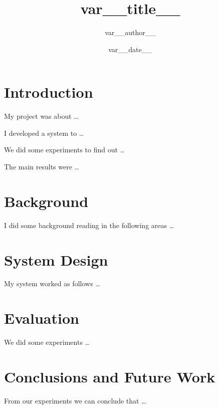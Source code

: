 \documentclass[a4paper, var__font__pt]{article}
\title{var__title__}
\author{var__author__}
\date{var__date__}
\begin{document}
\maketitle
\tableofcontents

\section{Introduction}

My project was about \ldots

I developed a system to \ldots

We did some experiments to find out \ldots

The main results were \ldots

\pagebreak

\section{Background}

I did some background reading in the following areas \ldots

\pagebreak

\section{System Design}

My system worked as follows \ldots

\pagebreak

\section{Evaluation}

We did some experiments \ldots

\pagebreak

\section{Conclusions and Future Work}

From our experiments we can conclude that \ldots


\end{document}
